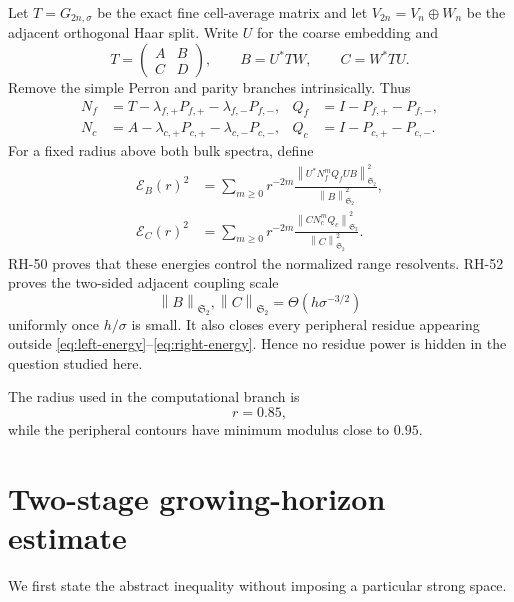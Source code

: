 \documentclass[11pt]{article}
\theoremstyle{remark}
\newcommand{\norm}[1]{\left\lVert#1\right\rVert}
\newcommand{\HS}{\mathfrak S_2}
\newcommand{\Id}{I}
\newcommand{\cE}{\mathcal E}
\begin{document}
Let $T=G_{2n,\sigma}$ be the exact fine cell-average matrix and let
$V_{2n}=V_n\oplus W_n$ be the adjacent orthogonal Haar split.  Write $U$ for
the coarse embedding and
\[
 T=\begin{pmatrix}A&B\\C&D\end{pmatrix},
 \qquad
 B=U^*TW,
 \qquad
 C=W^*TU.
\]
Remove the simple Perron and parity branches intrinsically.  Thus
\begin{align*}
 N_f&=T-\lambda_{f,+}P_{f,+}-\lambda_{f,-}P_{f,-},
 &Q_f&=\Id-P_{f,+}-P_{f,-},\\
 N_c&=A-\lambda_{c,+}P_{c,+}-\lambda_{c,-}P_{c,-},
 &Q_c&=\Id-P_{c,+}-P_{c,-}.
\end{align*}
For a fixed radius above both bulk spectra, define
\begin{align}
 \cE_B(r)^2
 &=\sum_{m\ge0}r^{-2m}
 \frac{\norm{U^*N_f^mQ_fUB}_{\HS}^2}{\norm B_{\HS}^2},
 \label{eq:left-energy}\\
 \cE_C(r)^2
 &=\sum_{m\ge0}r^{-2m}
 \frac{\norm{CN_c^mQ_c}_{\HS}^2}{\norm C_{\HS}^2}.
 \label{eq:right-energy}
\end{align}
RH-50 proves that these energies control the normalized range resolvents.
RH-52 proves the two-sided adjacent coupling scale
\begin{equation}
 \norm B_{\HS},\norm C_{\HS}
 =\Theta(h\sigma^{-3/2})
 \label{eq:coupling-scale}
\end{equation}
uniformly once $h/\sigma$ is small.  It also closes every peripheral residue
appearing outside \eqref{eq:left-energy}--\eqref{eq:right-energy}.  Hence no
residue power is hidden in the question studied here.

The radius used in the computational branch is
\begin{equation}
 r=0.85,
 \label{eq:r-value}
\end{equation}
while the peripheral contours have minimum modulus close to $0.95$.

\section{Two-stage growing-horizon estimate}

We first state the abstract inequality without imposing a particular strong
space.
\end{document}
